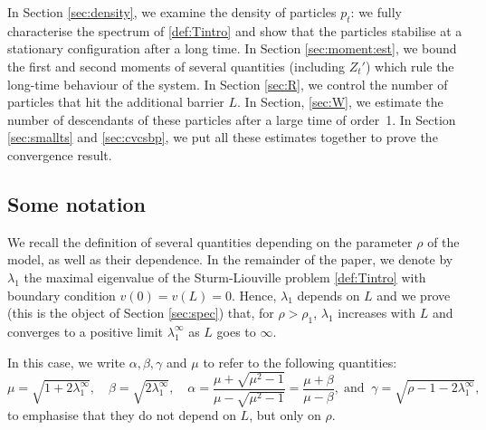 \documentclass[11pt]{article}
\theoremstyle{plain}
\newcommand\linf{\lambda_1^\infty}
\begin{document}
In Section \ref{sec:density}, we examine the density of particles $p_t$: we fully characterise the spectrum of \eqref{def:Tintro} and show that the particles stabilise at a stationary configuration after a long time.
In Section \ref{sec:moment:est}, we bound the first and second moments of several quantities (including $Z_t'$) which rule the long-time behaviour of the system.
In Section \ref{sec:R}, we control the number of particles that hit the additional barrier $L$. In Section, \ref{sec:W}, we estimate the number of descendants of these particles after a large time of order~1. In Section \ref{sec:smallts} and \ref{sec:cvcsbp}, we put all these estimates together to prove the convergence result.



\subsection{Some notation}
We recall the definition of several quantities  depending  on the parameter $\rho$ of the model, as well as their dependence. In the remainder of the paper, we denote by $\lambda_1$ the maximal eigenvalue of the Sturm-Liouville problem \eqref{def:Tintro} with boundary condition $v(0)=v(L)=0$. Hence, $\lambda_1$ depends on $L$ and we prove (this is the object of Section \ref{sec:spec}) that, for $\rho>\rho_1$, $\lambda_1$ increases with $L$ and converges to a positive limit $\linf$ as $L$ goes to $\infty$.

In this case, we write $\alpha, \beta, \gamma$ and $\mu$ to refer to the following quantities:
\begin{equation}
\label{defnot}
\mu=\sqrt{1+2\linf}, \quad \beta=\sqrt{2\linf}, \quad  \alpha=\frac{\mu+\sqrt{\mu^2-1}}{\mu-\sqrt{\mu^2-1}}=\frac{\mu+\beta}{\mu-\beta}, \; \text{and} \; \; \gamma=\sqrt{\rho-1-2\linf},
\end{equation}  
to emphasise that they do not depend on $L$, but only on $\rho$.
\end{document}
